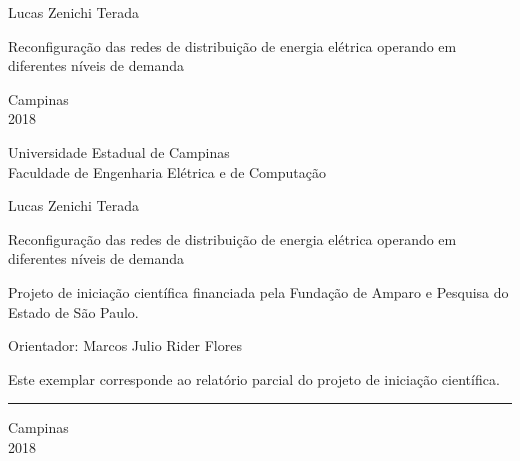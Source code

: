 \begin{titlepage}
    \vspace*{2.0cm}
    \begin{center}
    \large{Lucas Zenichi Terada}
    \end{center}
    
    
    \vspace*{4.8cm}
    
    \begin{center}
    {\sc \Large  Reconfiguração das redes de distribuição de energia elétrica operando em diferentes níveis de demanda}
    \end{center}
    
    
    \vspace*{3.25cm}
    
    
    \null \vfill
    
    \begin{center}
    Campinas\\2018
    \end{center}
\end{titlepage}


\begin{center}
\large Universidade Estadual de Campinas\\
Faculdade de Engenharia Elétrica e de Computação
\end{center}

\vspace*{1.0cm}
\begin{center}
\large Lucas Zenichi Terada
\end{center}

    
\vspace*{1.3cm}
    
\begin{center}
    {\sc Reconfiguração das redes de distribuição de energia elétrica operando em diferentes níveis de demanda}
\end{center}
    
\vspace*{0.5cm}

    
\vspace*{1.0cm}
    
\begin{flushright}
\begin{minipage}{11.0cm}
Projeto de iniciação científica financiada pela Fundação de Amparo e Pesquisa do Estado de São Paulo. 
    
\vspace*{0.5cm}
    
\vspace*{1.0cm}
Orientador: Marcos Julio Rider Flores
    
\end{minipage}
\end{flushright}
    
\null \vfill
\begin{minipage}{7cm}
\small
Este exemplar corresponde ao relatório parcial do projeto de iniciação científica.    
\rule{6.9cm}{0.2mm} \hfill 
\end{minipage}
    
\null \vfill
\begin{center}
    Campinas\\2018
\end{center}
\thispagestyle{empty}
\newpage